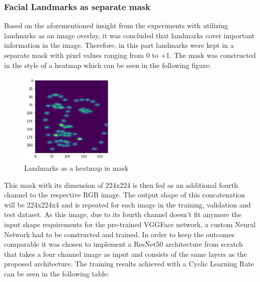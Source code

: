 \subsubsection{Facial Landmarks as separate mask}
Based on the aforementioned insight from the experiments with utilizing landmarks as an image overlay, it was concluded that landmarks cover important information in the image. Therefore, in this part landmarks were kept in a separate mask with pixel values ranging from 0 to +1. The mask was constructed in the style of a heatmap which can be seen in the following figure:

\begin{figure}[H]
  \begin{center}
  \includegraphics[angle=0, width=0.4\textwidth]{Figures/landmarks_as_heatmap_in_mask.png}
  \caption{Landmarks as a heatmap in mask}
  \label{fig:LandmarksMask}
  \end{center}
\end{figure}

This mask with its dimension of 224x224 is then fed as an additional fourth channel to the respective RGB image. The output shape of this concatenation will be 224x224x4 and is repeated for each image in the training, validation and test dataset.
\newline\newline
As this image, due to its fourth channel doesn't fit anymore the input shape requirements for the pre-trained VGGFace network, a custom Neural Network had to be constructed and trained. In order to keep the outcomes comparable it was chosen to implement a ResNet50 architecture from scratch that takes a four channel image as input and consists of the same layers as the proposed architecture. The training results achieved with a Cyclic Learning Rate can be seen in the following table:

